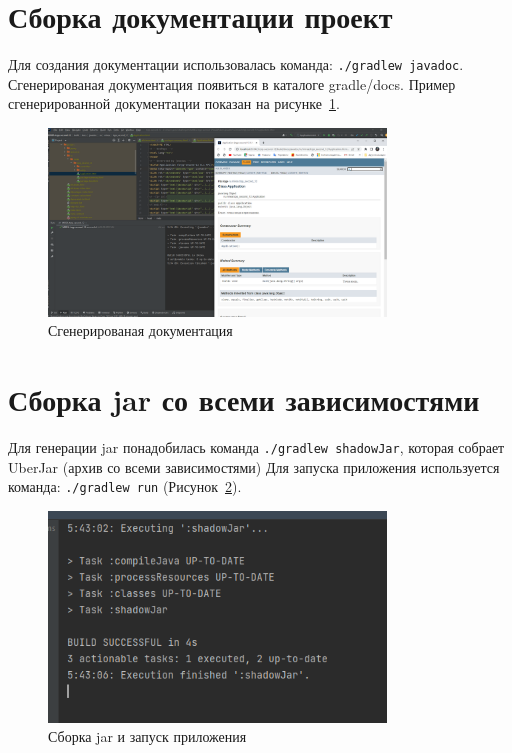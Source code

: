 \section{Сборка документации проект}
Для создания документации использовалась команда: \texttt{./gradlew~javadoc}.
Сгенерированая документация появиться в каталоге gradle/docs.
Пример сгенерированной документации показан
на рисунке~\ref{fig:gradle:javadoc}.

\begin{figure}[h!tp]
	\centering
	\includegraphics[width=0.8\textwidth]{png_2}
	\caption{Сгенерированая документация}
	\label{fig:gradle:javadoc}
\end{figure}

\section{Сборка jar со всеми зависимостями}
Для генерации jar понадобилась команда \texttt{./gradlew shadowJar},
которая собрает UberJar (архив со всеми зависимостями)
Для запуска приложения используется команда: \texttt{./gradlew run}
(Рисунок~\ref{fig:gradle:run}).

\begin{figure}[h!tp]
	\centering
	\includegraphics[width=0.8\textwidth]{png_4}
	\caption{Сборка jar и запуск приложения}
	\label{fig:gradle:run}
\end{figure}

